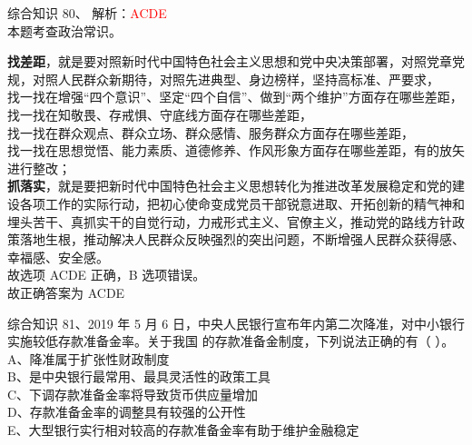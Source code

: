 \documentclass[aspectratio=169]{beamer}
\begin{document}
\begin{frame}[t]{综合知识}
    80、  解析：\textcolor{red}{ACDE}\\
    本题考查政治常识。\\
    {\small

    \textbf{找差距}，就是要对照新时代中国特色社会主义思想和党中央决策部署，对照党章党规，对照人民群众新期待，对照先进典型、身边榜样，坚持高标准、严要求，\\
    找一找在增强“四个意识”、坚定“四个自信”、做到“两个维护”方面存在哪些差距，\\
    找一找在知敬畏、存戒惧、守底线方面存在哪些差距，\\
    找一找在群众观点、群众立场、群众感情、服务群众方面存在哪些差距，\\
    找一找在思想觉悟、能力素质、道德修养、作风形象方面存在哪些差距，有的放矢进行整改；\\
    \textbf{抓落实}，就是要把新时代中国特色社会主义思想转化为推进改革发展稳定和党的建设各项工作的实际行动，把初心使命变成党员干部锐意进取、开拓创新的精气神和埋头苦干、真抓实干的自觉行动，力戒形式主义、官僚主义，推动党的路线方针政策落地生根，推动解决人民群众反映强烈的突出问题，不断增强人民群众获得感、幸福感、安全感。\\
    故选项 ACDE 正确，B 选项错误。\\
    故正确答案为 ACDE\\
    }
\end{frame}                           



\begin{frame}[t]{综合知识}
    81、2019 年 5 月 6 日，中央人民银行宣布年内第二次降准，对中小银行实施较低存款准备金率。关于我国
    的存款准备金制度，下列说法正确的有（ ）。                    \\
    A、降准属于扩张性财政制度                                    \\
    B、是中央银行最常用、最具灵活性的政策工具                    \\
    C、下调存款准备金率将导致货币供应量增加                      \\
    D、存款准备金率的调整具有较强的公开性                        \\
    E、大型银行实行相对较高的存款准备金率有助于维护金融稳定      \\
\end{frame}                           
\end{document}
